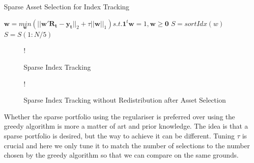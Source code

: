 \documentclass[11pt]{article}
\begin{document}
\begin{algorithm}[H]
\caption{Sparse Asset Selection for Index Tracking}
\label{alg:sparse-index}
\begin{algorithmic}

\State $\bm{w} = \underset{\bm{w}}{min}(||\bm{w}'\bm{R_t} - \bm{y_t}||_2 + \tau||\bm{w}||_1) s.t. \bm{1}^t\bm{w} = 1, \bm{w} \geq \bm{0}$
\State $S = sortIdx(w)$
\State $S = S(1:N/5)$

\end{algorithmic}
\end{algorithm}

\begin{figure}[!h]
   \vspace{-0.5cm}
	\centering 
 	 {!} { }
    \caption{Sparse Index Tracking}
	\label{fig:q3-sparse}
	\vspace{-0.5cm}
\end{figure}

\begin{figure}[!h]
	\vspace{-0.5cm}
   \centering 
 	 {!} { }
    \caption{Sparse Index Tracking without Redistribution after Asset Selection}
	\label{fig:q3-sparse-no-distribution}
	\vspace{-0.5cm}
\end{figure}

Whether the sparse portfolio using the regulariser is preferred over using the greedy algorithm is more a matter of art and prior 
knowledge. The idea is that a sparse portfolio is desired, but the way to achieve it can be different. Tuning $\tau$ is crucial and
here we only tune it to match the number of selections to the number chosen by the greedy algorithm so that we can compare
on the same grounds.
\end{document}
